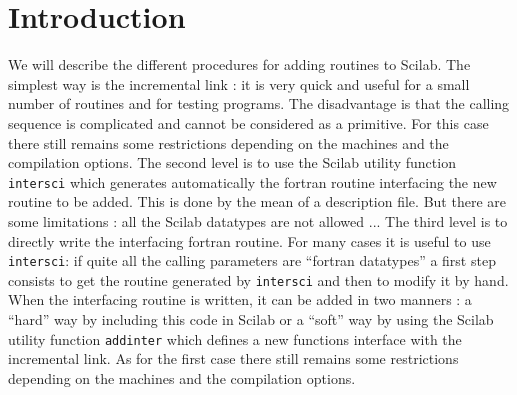 \chapter{Introduction}

We will describe the different procedures for adding routines to Scilab.
The simplest way is the incremental link : it is very quick and useful 
for a small number of routines and for testing programs. The disadvantage
is that the calling sequence is complicated and cannot be considered as a 
primitive. For this case there still remains some restrictions depending on
the machines and the compilation options.
The second level is to use the Scilab utility function {\tt intersci} which 
generates  automatically the 
fortran routine interfacing the new routine to be added. This is done by the 
mean of a description file. But there are some limitations : all the Scilab 
datatypes are not allowed ...
The third level is to directly write the interfacing fortran routine. For many
cases it is useful to use {\tt intersci}: if quite all the calling parameters 
are ``fortran datatypes'' a first step consists to get the routine
generated by {\tt intersci} and then to modify it by hand.
When the interfacing routine is written, it can be added in two manners :
a ``hard'' way by including this code in Scilab or a ``soft'' way by using
the Scilab utility function {\tt addinter} which defines a new functions 
interface with the incremental link. As for the first case there still 
remains some restrictions depending on the machines and the compilation 
options.



